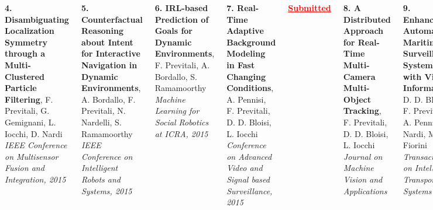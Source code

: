 \begin{frame}
\begin{columns}[t]
		\vspace{0.15cm}
		
		\textbf{4. Disambiguating Localization Symmetry through a Multi-Clustered Particle Filtering},
		F. Previtali, G. Gemignani, L. Iocchi, D. Nardi \\
		\emph{IEEE Conference on Multisensor Fusion and Integration, 2015}
		
		\vspace{0.15cm}
		
		\textbf{5. Counterfactual Reasoning about Intent for Interactive Navigation in Dynamic
		Environments}, A. Bordallo, F. Previtali, N. Nardelli, S. Ramamoorthy \\
		\emph{IEEE Conference on Intelligent Robots and Systems, 2015}
		
		\vspace{0.15cm}
		
		\textbf{6. IRL-based Prediction of Goals for Dynamic Environments}, F. Previtali, A. Bordallo,
		S. Ramamoorthy \\
		\emph{Machine Learning for Social Robotics at ICRA, 2015}
		
		
		\vspace{0.34cm}
		
		\tiny
		
		\textbf{7. Real-Time Adaptive Background Modeling in Fast Changing Conditions}, A. Pennisi, F.
		Previtali, D. D. Bloisi, L. Iocchi \\
		\emph{Conference on Advanced Video and Signal based Surveillance, 2015}
		
		\vspace{0.2cm}
		
		\textcolor{red}{\textbf{\underline{Submitted}}}
		
		\vspace{0.1cm}
		
		\textbf{8. A Distributed Approach for Real-Time Multi-Camera Multi-Object Tracking}, F.
		Previtali, D. D. Bloisi, L. Iocchi \\
		\emph{Journal on Machine Vision and Applications}
		
		\vspace{0.15cm}
		
		\textbf{9. Enhancing Automatic Maritime Surveillance Systems with Visual Information}, D. D.
		Bloisi, F. Previtali, A. Pennisi, D. Nardi, M. Fiorini \\
		\emph{Transaction on Intelligent Transportation Systems}
		

\end{columns}
\end{frame}
